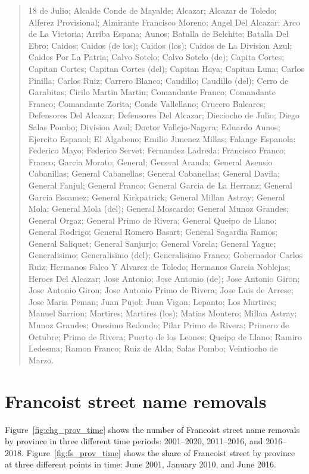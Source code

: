 \documentclass[12pt, titlepage]{article}
\begin{document}
\begin{quote}
  18 de Julio; Alcalde Conde de Mayalde; Alcazar; Alcazar de Toledo; Alferez Provisional; Almirante Francisco Moreno; Angel Del Alcazar; Arco de La Victoria; Arriba Espana; Aunos; Batalla de Belchite; Batalla Del Ebro; Caidos; Caidos (de los); Caidos (los); Caidos de La Division Azul; Caidos Por La Patria; Calvo Sotelo; Calvo Sotelo (de); Capita Cortes; Capitan Cortes; Capitan Cortes (del); Capitan Haya; Capitan Luna; Carlos Pinilla; Carlos Ruiz; Carrero Blanco; Caudillo; Caudillo (del); Cerro de Garabitas; Cirilo Martin Martin; Comandante Franco; Comandante Franco; Comandante Zorita; Conde Vallellano; Crucero Baleares; Defensores Del Alcazar; Defensores Del Alcazar; Dieciocho de Julio; Diego Salas Pombo; Division Azul; Doctor Vallejo-Nagera; Eduardo Aunos; Ejercito Espanol; El Algabeno; Emilio Jimenez Millas; Falange Espanola; Federico Mayo; Federico Servet; Fernandez Ladreda; Francisco Franco; Franco; Garcia Morato; General; General Aranda; General Asensio Cabanillas; General Cabanellas; General Cabanellas; General Davila; General Fanjul; General Franco; General Garcia de La Herranz; General Garcia Escamez; General Kirkpatrick; General Millan Astray; General Mola; General Mola (del); General Moscardo; General Munoz Grandes; General Orgaz; General Primo de Rivera; General Queipo de Llano; General Rodrigo; General Romero Basart; General Sagardia Ramos; General Saliquet; General Sanjurjo; General Varela; General Yague; Generalisimo; Generalisimo (del); Generalisimo Franco; Gobernador Carlos Ruiz; Hermanos Falco Y Alvarez de Toledo; Hermanos Garcia Noblejas; Heroes Del Alcazar; Jose Antonio; Jose Antonio (de); Jose Antonio Giron; Jose Antonio Giron; Jose Antonio Primo de Rivera; Jose Luis de Arrese; Jose Maria Peman; Juan Pujol; Juan Vigon; Lepanto; Los Martires; Manuel Sarrion; Martires; Martires (los); Matias Montero; Millan Astray; Munoz Grandes; Onesimo Redondo; Pilar Primo de Rivera; Primero de Octubre; Primo de Rivera; Puerto de los Leones; Queipo de Llano; Ramiro Ledesma; Ramon Franco; Ruiz de Alda; Salas Pombo; Veintiocho de Marzo.
\end{quote}

\section{Francoist street name removals}

Figure~\ref{fig:chg_prov_time} shows the number of Francoist street name removals by province in three different time periods: 2001--2020, 2011--2016, and 2016--2018.
Figure~\ref{fig:fs_prov_time} shows the share of Francoist street by province at three different points in time: June 2001, January 2010, and June 2016.
\end{document}
